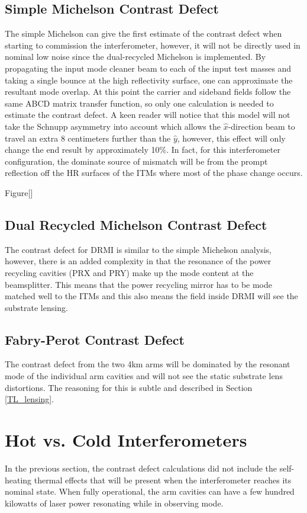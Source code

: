 	\subsection{Simple Michelson Contrast Defect}
	The simple Michelson can give the first estimate of the contrast defect when starting to commission the interferometer, however, it will not be directly used in nominal low noise since the dual-recycled Michelson is implemented.  By propagating the input mode cleaner beam to each of the input test masses and taking a single bounce at the high reflectivity surface, one can approximate the resultant mode overlap.  At this point the carrier and sideband fields follow the same ABCD matrix transfer function, so only one calculation is needed to estimate the contrast defect.  A keen reader will notice that this model will not take the Schnupp asymmetry into account which allows the $\hat{x}$-direction beam to travel an extra 8 centimeters further than the $\hat{y}$, however, this effect will only change the end result by approximately 10$\%$.  In fact, for this interferometer configuration, the dominate source of mismatch will be from the prompt reflection off the HR surfaces of the ITMs where most of the phase change occurs.
	
	Figure[]

	\subsection{Dual Recycled Michelson Contrast Defect}
	The contrast defect for DRMI is similar to the simple Michelson analysis, however, there is an added complexity in that the resonance of the power recycling cavities (PRX and PRY) make up the mode content at the beamsplitter.  This means that the power recycling mirror has to be mode matched well to the ITMs and this also means the field inside DRMI will see the substrate lensing.
	\subsection{Fabry-Perot Contrast Defect}
	The contrast defect from the two 4km arms will be dominated by the resonant mode of the individual arm cavities and will not see the static substrate lens distortions.
	The reasoning for this is subtle and described in Section \ref{TL_lensing}.
	
	\section{Hot vs. Cold Interferometers}\label{sec:hotcoldifo}
	In the previous section, the contrast defect calculations did not include the self-heating thermal effects that will be present when the interferometer reaches its nominal state.  When fully operational, the arm cavities can have a few hundred kilowatts of laser power resonating while in observing mode. 
	

